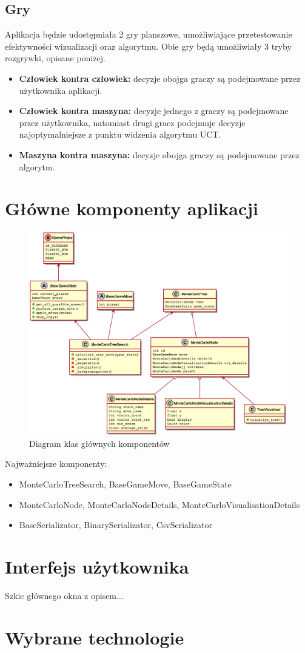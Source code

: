 \documentclass{article}
\let\oldsection\section
\renewcommand\section{\clearpage\oldsection}
\begin{document}
	
	\subsection{Gry}
	Aplikacja będzie udostępniała 2 gry planszowe, umożliwiające przetestowanie efektywności wizualizacji oraz algorytmu. Obie gry będą umożliwiały 3 tryby rozgrywki, opisane poniżej. \\
	
	\begin{itemize}
		\item \textbf{Człowiek kontra człowiek:} decyzje obojga graczy są podejmowane przez użytkownika aplikacji.
		\item \textbf{Człowiek kontra maszyna:} decyzje jednego z graczy są podejmowane przez użytkownika, natomiast drugi gracz podejmuje decyzje najoptymalniejsze z punktu widzenia algorytmu UCT.
		\item \textbf{Maszyna kontra maszyna:} decyzje obojga graczy są podejmowane przez algorytm. \\ 
	\end{itemize}
	
	
	\section{Główne komponenty aplikacji}
	\begin{figure}[h]
		\centering
		\includegraphics[width=\textwidth]{umldiagram}
		\caption{Diagram klas głównych komponentów}
		\label{rys:gantt}
	\end{figure}
	Najważniejsze komponenty:
	\begin{itemize}
		\item MonteCarloTreeSearch, BaseGameMove, BaseGameState
		\item MonteCarloNode, MonteCarloNodeDetails, MonteCarloVisualisationDetails
		\item BaseSerializator, BinarySerializator, CsvSerializator
	\end{itemize}
	
	\section{Interfejs użytkownika}
	Szkic głównego okna z opisem...
	
	\section{Wybrane technologie}
\end{document}
